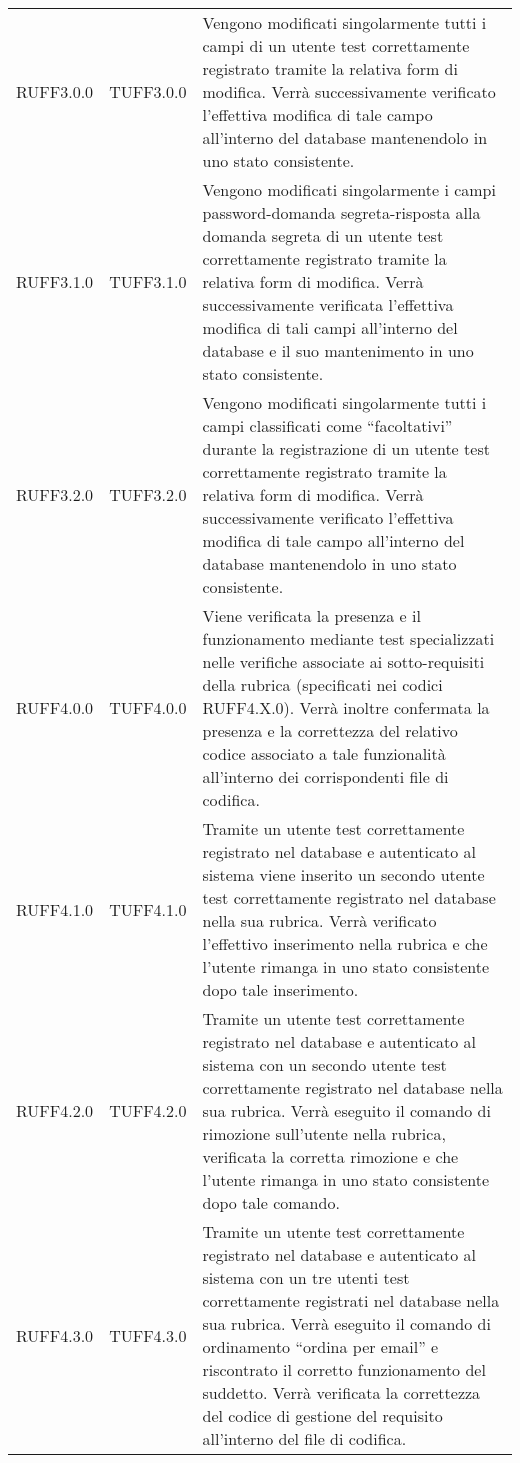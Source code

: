 \begin{center}
\begin{longtable}{llp{}}
RUFF3.0.0 & TUFF3.0.0& Vengono modificati singolarmente tutti i campi di un utente test correttamente registrato tramite la relativa form di modifica. Verrà successivamente verificato l'effettiva modifica di tale campo all'interno del database mantenendolo in uno stato consistente.\\
RUFF3.1.0 & TUFF3.1.0& Vengono modificati singolarmente i campi password-domanda segreta-risposta alla domanda segreta di un utente test correttamente registrato tramite la relativa form di modifica. Verrà successivamente verificata l'effettiva modifica di tali campi all'interno del database e il suo mantenimento in uno stato consistente.\\
RUFF3.2.0 & TUFF3.2.0& Vengono modificati singolarmente tutti i campi classificati come ``facoltativi'' durante la registrazione di un utente test correttamente registrato tramite la relativa form di modifica. Verrà successivamente verificato l'effettiva modifica di tale campo all'interno del database mantenendolo in uno stato consistente.\\
RUFF4.0.0 & TUFF4.0.0& Viene verificata la presenza e il funzionamento mediante test specializzati nelle verifiche associate ai sotto-requisiti della rubrica (specificati nei codici RUFF4.X.0). Verrà inoltre confermata la presenza e la correttezza del relativo codice associato a tale funzionalità all'interno dei corrispondenti file di codifica.\\
RUFF4.1.0 & TUFF4.1.0& Tramite un utente test correttamente registrato nel database e autenticato al sistema viene inserito un secondo utente test correttamente registrato nel database nella sua rubrica. Verrà verificato l'effettivo inserimento nella rubrica e che l'utente rimanga in uno stato consistente dopo tale inserimento.\\
RUFF4.2.0 & TUFF4.2.0& Tramite un utente test correttamente registrato nel database e autenticato al sistema con un secondo utente test correttamente registrato nel database nella sua rubrica. Verrà eseguito il comando di rimozione sull'utente nella rubrica, verificata la corretta rimozione e che l'utente rimanga in uno stato consistente dopo tale comando.\\
RUFF4.3.0 & TUFF4.3.0& Tramite un utente test correttamente registrato nel database e autenticato al sistema con un tre utenti test correttamente registrati nel database nella sua rubrica. Verrà eseguito il comando di ordinamento ``ordina per email'' e riscontrato il corretto funzionamento del suddetto. Verrà verificata la correttezza del codice di gestione del requisito all'interno del file di codifica.\\

\end{longtable}
\end{center}
